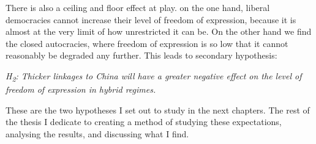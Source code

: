 There is also a ceiling and floor effect at play. on the one hand, liberal democracies cannot increase their level of freedom of expression, because it is almost at the very limit of how unrestricted it can be. On the other hand we find the closed autocracies, where freedom of expression is so low that it cannot reasonably be degraded any further. This leads to secondary hypothesis:
\begin{displayquote}
    \textit{H\textsubscript{2}: Thicker linkages to China will have a greater negative effect on the level of freedom of expression in hybrid regimes.}
\end{displayquote}

These are the two hypotheses I set out to study in the next chapters. The rest of the thesis I dedicate to creating a method of studying these expectations, analysing the results, and discussing what I find. 